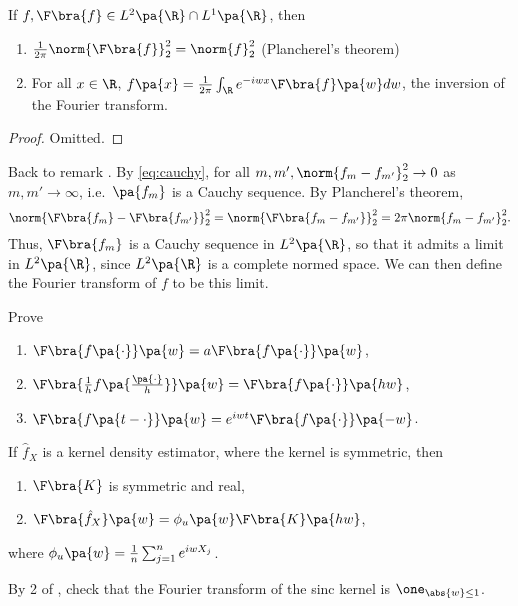 \begin{proposition}\label{prop:plancherel_inverse}
  If $f,\F\bra{f}\in L^2\pa{\R}\cap L^1\pa{\R}$, then
  \begin{enumerate}
  \item $\frac{1}{2\pi} \norm{\F\bra{f}}^2_2 = \norm{f}^2_2$ (Plancherel's theorem)
  \item For all $x\in \R$, $f\pa{x} = \frac{1}{2\pi} \int_\R e^{-iwx} \F\bra{f}\pa{w}dw$, the inversion of the Fourier transform.
  \end{enumerate}
\end{proposition}
\begin{proof}
  Omitted.
\end{proof}

\begin{remark}
  Back to remark . By \cref{eq:cauchy}, for all $m,m', \norm{f_m -f_{m'}}_2^2\rightarrow 0$ as $m,m'\rightarrow \infty$, i.e.~$\pa{f_m}$ is a Cauchy sequence. By Plancherel's theorem,
  \begin{equation}
    \norm{\F \bra{f_m} -\F\bra{f_{m'}} }_2^2 = \norm{\F \bra{f_m -f_{m'} }}_2^2 = 2\pi \norm{f_m -f_{m'}}_2^2.
  \end{equation}
  Thus, $\F\bra{f_m}$ is a Cauchy sequence in $L^2\pa{\R}$, so that it admits a limit in $L^2\pa{\R}$, since $L^2\pa{\R}$ is a complete normed space. We can then define the Fourier transform of $f$ to be this limit.
\end{remark}
\begin{exercise}
 Prove
 \begin{enumerate}
   \item $\F\bra{f\pa{\cdot}} \pa{w} = a \F \bra{f\pa{\cdot}}\pa{w}$,
   \item $\F\bra{\frac{1}{h}f\pa{\frac{\pa{\cdot}}{h}}}\pa{w} = \F\bra{f\pa{\cdot}}\pa{hw}$,
   \item $\F\bra{f\pa{t-\cdot}}\pa{w} = e^{iwt} \F\bra{f\pa{\cdot}} \pa{-w}$.
 \end{enumerate}
\end{exercise}
\begin{exercise}
  If $\hat{f}_X$ is a kernel density estimator, where the kernel is symmetric, then
  \begin{enumerate}
    \item $\F\bra{K}$ is symmetric and real,
    \item $\F\bra{\hat{f}_X}\pa{w} = \phi_u \pa{w} \F\bra{K} \pa{hw}$,
  \end{enumerate}
  where $\phi_u \pa{w} = \frac{1}{n}\sum_{j=1}^n e^{iwX_j}$.
\end{exercise}
\begin{exercise}
  By 2 of , check that the Fourier transform of the sinc kernel is $\one_{\abs{w}\leq 1}$.
\end{exercise}

